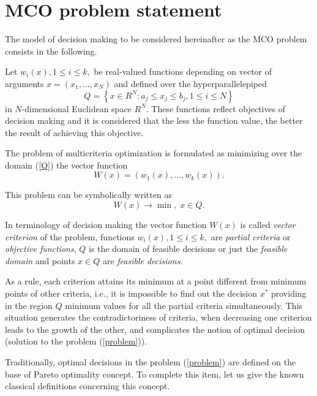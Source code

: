 \documentclass[runningheads]{llncs}
\begin{document}
\section{MCO problem statement}

The model of decision making to be considered hereinafter as the MCO problem consists in the following.

Let $w_i(x), 1 \leq i \leq k,$ be real-valued functions depending on vector of arguments $x=(x_1,...,x_N)$  and defined over the hyperparallelepiped 
\begin{equation}\label{Q}
Q = \left\{x \in R^N : a_j \leq x_j \leq b_j, 1 \leq i \leq N \right\}
\end{equation}
in $N$-dimensional Euclidean space $R^N$. These functions reflect objectives of decision making and it is considered that the less the function value, the better the result of achieving this objective.

The problem of multicriteria optimization is formulated as minimizing over the domain (\ref{Q}) the vector function
\begin{equation}\label{W}
W(x) = \left(w_1(x), ..., w_k(x)\right).
\end{equation}

This problem can be symbolically written as
\begin{equation}\label{problem}
W(x) \rightarrow \min , \; x \in Q.
\end{equation}

In terminology of decision making the vector function $W(x)$  is called \textit{vector criterion} of the problem, functions $w_i(x), 1 \leq i \leq k,$ are \textit{partial criteria} or \textit{objective functions}, $Q$ is the domain of feasible decisions or just the \textit{feasible domain} and points $x \in Q$ are \textit{feasible decisions}.

As a rule, each criterion attains its minimum at a point different from minimum points of other criteria, i.e., it is impossible to find out the decision $x^*$   providing in the region $Q$ minimum values for all the partial criteria simultaneously. This situation generates the contradictoriness of criteria, when decreasing one criterion leads to the growth of the other, and complicates the notion of optimal decision (solution to the problem (\ref{problem})).

Traditionally, optimal decisions in the problem (\ref{problem}) are defined on the base of Pareto optimality concept. To complete this item, let us give the known classical definitions concerning this concept.
\end{document}
